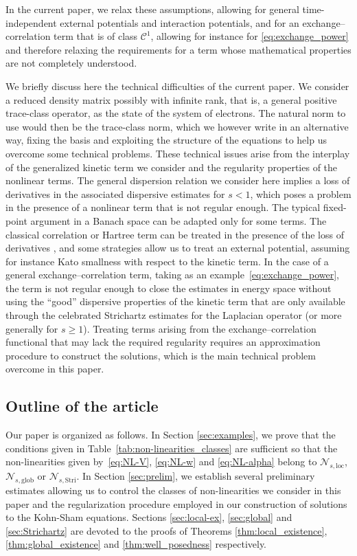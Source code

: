 \documentclass[12pt,a4paper]{amsart}
\numberwithin{equation}{section}
\newcommand{\Nloc}{\mathscr{N}_{s,\mathrm{loc}}}
\newcommand{\Nglob}{\mathscr{N}_{s,\mathrm{glob}}}
\newcommand{\NStri}{\mathscr{N}_{s,\mathrm{Stri}}}
\begin{document}
	In the current paper, we relax these assumptions, allowing for general time-independent external potentials and interaction potentials, and for an exchange–correlation term that is of class $\mathscr{C}^1$, allowing for instance for \eqref{eq:exchange_power} and therefore relaxing the requirements for a term whose mathematical properties are not completely understood.
	
	We briefly discuss here the technical difficulties of the current paper. We consider a reduced density matrix possibly with infinite rank, that is, a general positive trace-class operator, as the state of the system of electrons.
	The natural norm to use would then be the trace-class norm, which we however write in an alternative way, fixing the basis and exploiting the structure of the equations to help us overcome some technical problems. These technical issues arise from the interplay of the generalized kinetic term we consider and the regularity properties of the nonlinear terms. The general dispersion relation we consider here implies a loss of derivatives in the associated dispersive estimates for $s < 1$, which poses a problem in the presence of a nonlinear term that is not regular enough. The typical fixed-point argument in a Banach space can be adapted only for some terms. The classical correlation or Hartree term can be treated in the presence of the loss of derivatives \cite{breteaux2025propagation}, and some strategies allow us to treat an external potential, assuming for instance Kato smallness with respect to the kinetic term. In the case of a general exchange–correlation term, taking as an example~\eqref{eq:exchange_power}, the term is not regular enough to close the estimates in energy space without using the “good” dispersive properties of the kinetic term that are only available through the celebrated Strichartz estimates for the Laplacian operator (or more generally for $s\ge1$). Treating terms arising from the exchange–correlation functional that may lack the required regularity requires an approximation procedure to construct the solutions, which is the main technical problem overcome in this paper.
	
	
	\subsection{Outline of the article}
	Our paper is organized as follows. In Section \ref{sec:examples}, we prove that the conditions given in Table~\ref{tab:non-linearities_classes} are sufficient so that the non-linearities given by~\eqref{eq:NL-V}, \eqref{eq:NL-w} and \eqref{eq:NL-alpha} belong to $\Nloc$, $\Nglob$ or $\NStri$. In Section \ref{sec:prelim}, we establish several preliminary estimates allowing us to control the classes of non-linearities we consider in this paper and the regularization procedure employed in our construction of solutions to the Kohn-Sham equations. Sections \ref{sec:local-ex}, \ref{sec:global} and \ref{sec:Strichartz} are devoted to the proofs of Theorems \ref{thm:local_existence}, \ref{thm:global_existence} and \ref{thm:well_posedness} respectively. 
	
\end{document}

